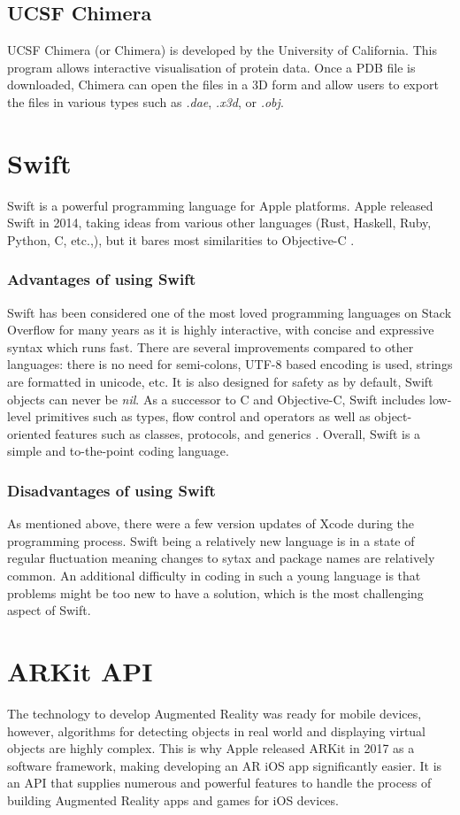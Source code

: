 	\subsection{UCSF Chimera}
UCSF Chimera (or Chimera) is developed by the University of California. This program allows interactive visualisation of protein data. Once a PDB file is downloaded, Chimera can open the files in a 3D form and allow users to export the files in various types such as \emph{.dae}, \emph{.x3d}, or \emph{.obj}.
	
	\section{Swift}
Swift is a powerful programming language for Apple platforms. Apple released Swift in 2014, taking ideas from various other languages (Rust, Haskell, Ruby, Python, C, etc.,), but it bares most similarities to Objective-C  \parencite{noauthor_swift_nodate}. 
	\subsubsection{Advantages of using Swift}
Swift has been considered one of the most loved programming languages on Stack Overflow for many years as it is highly interactive, with concise and expressive syntax which runs fast. There are several improvements compared to other languages: there is no need for semi-colons, UTF-8 based encoding is used, strings are formatted in unicode, etc. It is also designed for safety as by default, Swift objects can never be \emph{nil}. As a successor to C and Objective-C, Swift includes low-level primitives such as types, flow control and operators as well as object-oriented features such as classes, protocols, and generics \parencite{noauthor_swift_nodate}. Overall, Swift is a simple and to-the-point coding language.
	\subsubsection{Disadvantages of using Swift}
As mentioned above, there were a few version updates of Xcode during the programming process. Swift being a relatively new language is in a state of regular fluctuation meaning changes to sytax and package names are relatively common. An additional difficulty in coding in such a young language is that problems might be too new to have a solution, which is the most challenging aspect of Swift.

\section{ARKit API}
The technology to develop Augmented Reality was ready for mobile devices, however, algorithms for detecting objects in real world and displaying virtual objects are highly complex. This is why Apple released ARKit in 2017 as a software framework, making developing an AR iOS app significantly easier. It is an API that supplies numerous and powerful features to handle the process of building Augmented Reality apps and games for iOS devices. 

